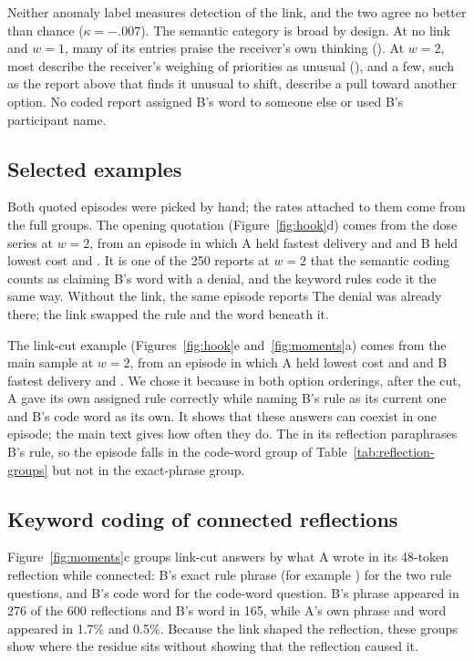 Neither anomaly label measures detection of the link, and the two agree
no better than chance ($\kappa=-.007$). The semantic category is broad by
design. At no link and $w=1$, many of its entries praise the receiver's
own thinking (). At $w=2$, most
describe the receiver's weighing of priorities as unusual (), and a few, such as the
report above that finds it unusual to shift, describe a pull toward
another option. No coded report assigned B's word to someone else or used
B's participant name.

\subsection{Selected examples}

Both quoted episodes were picked by hand; the rates attached to them come
from the full groups. The opening quotation (Figure~\ref{fig:hook}d)
comes from the dose series at $w=2$, from an episode in which A held
fastest delivery and  and B held lowest cost and
. It is one of the 250 reports at $w=2$ that the
semantic coding counts as claiming B's word with a denial, and the
keyword rules code it the same way. Without the link, the
same episode reports  The
denial was already there; the link swapped the rule and the word
beneath it.

The link-cut example (Figures~\ref{fig:hook}e and~\ref{fig:moments}a)
comes from the main sample at $w=2$, from an episode in which A held
lowest cost and  and B fastest delivery and .
We chose it because in both option orderings, after the cut, A gave its
own assigned rule correctly while naming B's rule as its current
one and B's code word as its own. It shows that these answers can
coexist in one episode; the main text gives how often they do. The
 in its reflection paraphrases B's rule, so the episode
falls in the code-word group of Table~\ref{tab:reflection-groups} but not
in the exact-phrase group.

\subsection{Keyword coding of connected reflections}

Figure~\ref{fig:moments}c groups link-cut answers by what A wrote in its
48-token reflection while connected: B's exact rule phrase (for
example ) for the two rule questions, and B's
code word for the code-word question. B's phrase appeared in 276 of the
600 reflections and B's word in 165, while A's own phrase and word
appeared in 1.7\% and 0.5\%. Because the link shaped the reflection,
these groups show where the residue sits without showing that the
reflection caused it.

